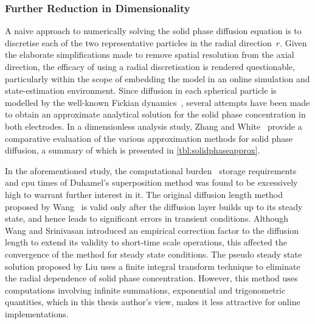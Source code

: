 

\subsubsection*{Further Reduction in Dimensionality}\label{subsec:basicspmfurtherdimensionalityreduction}

A naive approach to numerically solving the solid phase diffusion equation is to
discretise each of the two representative particles in the radial direction~$r$.
Given the elaborate  simplifications made to remove spatial  resolution from the
axial  direction, the  efficacy of  using  a radial  discretisation is  rendered
questionable, particularly within the scope of  embedding the model in an online
simulation and  state-estimation environment. Since diffusion  in each spherical
particle is modelled by the well-known Fickian dynamics~\cite{Fick1995}, several
attempts have  been made to  obtain an  approximate analytical solution  for the
solid phase concentration in both electrodes.
In a  dimensionless analysis study,  Zhang and White~\cite{Zhang2007}  provide a
comparative  evaluation of  the various  approximation methods  for solid  phase
diffusion, a summary of which is presented in \cref{tbl:solidphaseapprox}.



In the  aforementioned study, the computational  burden \ie~storage requirements
and  \gls{cpu}  times  of  Duhamel's   superposition  method  was  found  to  be
excessively  high to  warrant further  interest  in it.  The original  diffusion
length method proposed  by Wang~\etal{} is valid only after  the diffusion layer
builds  up  to its  steady  state,  and hence  leads  to  significant errors  in
transient  conditions.  Although Wang  and  Srinivasan  introduced an  empirical
correction factor to  the diffusion length to extend its  validity to short-time
scale operations, this  affected the convergence of the method  for steady state
conditions.  The pseudo  steady state  solution proposed  by Liu  uses a  finite
integral  transform  technique  to  eliminate the  radial  dependence  of  solid
phase concentration.  However, this method uses  computations involving infinite
summations,  exponential  and trigonometric  quantities,  which  in this  thesis
author's view, makes it less attractive for online implementations.


